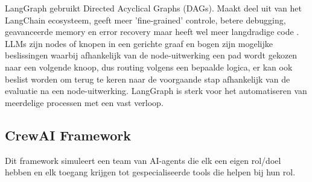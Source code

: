 LangGraph gebruikt Directed Acyclical Graphs (DAGs). Maakt deel uit van het LangChain ecosysteem, geeft meer 'fine-grained' controle, betere debugging, geavanceerde memory en error recovery maar heeft wel meer langdradige code \autocite{IBM2026}. \\

LLMs zijn nodes of knopen in een gerichte graaf en bogen zijn mogelijke beslissingen waarbij afhankelijk van de node-uitwerking een pad wordt gekozen naar een volgende knoop, dus routing volgens een bepaalde logica, er kan ook beslist worden om terug te keren naar de voorgaande stap afhankelijk van de evaluatie na een node-uitwerking. LangGraph is sterk voor het automatiseren van meerdelige processen met een vast verloop.

\subsection{CrewAI Framework}
\label{ssec:crewaiframework}
Dit framework simuleert een team van AI-agents die elk een eigen rol/doel hebben en elk toegang krijgen tot gespecialiseerde tools die helpen bij hun rol.

